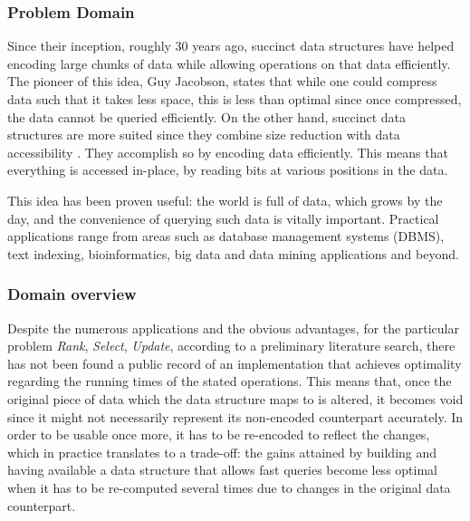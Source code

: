 
\subsubsection{Problem Domain}

Since their inception, roughly 30 years ago, succinct data structures have helped encoding large chunks of data while allowing operations on that data efficiently. The pioneer of this idea, Guy Jacobson, states that while one could compress data such that it takes less space, this is less than optimal since once compressed, the data cannot be queried efficiently. On the other hand, succinct data structures are more suited since they combine size reduction with data accessibility \cite{jacobson1988succinct}. They accomplish so by encoding data efficiently. This means that everything is accessed in-place, by reading bits at various positions in the data.

This idea has been proven useful: the world is full of data, which grows by the day, and the convenience of querying such data is vitally important. Practical applications range from areas such as database management systems (DBMS), text indexing, bioinformatics, big data and data mining applications and beyond.

\subsubsection{Domain overview}
Despite the numerous applications and the obvious advantages, for the particular problem \textit{Rank}, \textit{Select}, \textit{Update}, according to a preliminary literature search, there has not been found a public record of an implementation that achieves optimality regarding the running times of the stated operations. This means that, once the original piece of data which the data structure maps to is altered, it becomes void since it might not necessarily represent its non-encoded counterpart accurately. In order to be usable once more, it has to be re-encoded to reflect the changes, which in practice translates to a trade-off: the gains attained by building and having available a data structure that allows fast queries become less optimal when it has to be re-computed several times due to changes in the original data counterpart.

